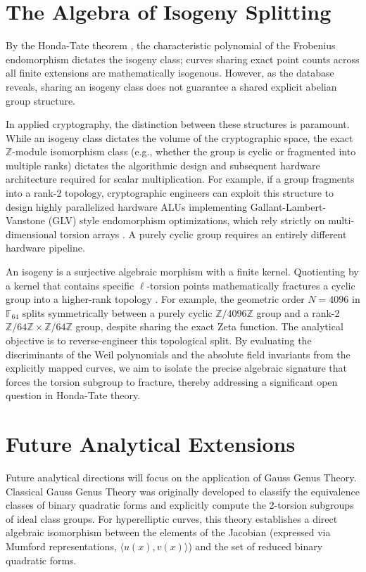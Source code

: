 \documentclass[11pt,letterpaper]{article}
\begin{document}
	\section{The Algebra of Isogeny Splitting}
	By the Honda-Tate theorem \cite{Tate1966}, the characteristic polynomial of the Frobenius endomorphism dictates the isogeny class; curves sharing exact point counts across all finite extensions are mathematically isogenous. However, as the database reveals, sharing an isogeny class does not guarantee a shared explicit abelian group structure.
	
	In applied cryptography, the distinction between these structures is paramount. While an isogeny class dictates the volume of the cryptographic space, the exact $\mathbb{Z}$-module isomorphism class (e.g., whether the group is cyclic or fragmented into multiple ranks) dictates the algorithmic design and subsequent hardware architecture required for scalar multiplication. For example, if a group fragments into a rank-2 topology, cryptographic engineers can exploit this structure to design highly parallelized hardware ALUs implementing Gallant-Lambert-Vanstone (GLV) style endomorphism optimizations, which rely strictly on multi-dimensional torsion arrays \cite{Gallant2001, Wollinger2005}. A purely cyclic group requires an entirely different hardware pipeline.
	
	An isogeny is a surjective algebraic morphism with a finite kernel. Quotienting by a kernel that contains specific $\ell$-torsion points mathematically fractures a cyclic group into a higher-rank topology \cite{Mazur1977}. For example, the geometric order $N=4096$ in $\mathbb{F}_{64}$ splits symmetrically between a purely cyclic $\mathbb{Z}/4096\mathbb{Z}$ group and a rank-2 $\mathbb{Z}/64\mathbb{Z} \times \mathbb{Z}/64\mathbb{Z}$ group, despite sharing the exact Zeta function. The analytical objective is to reverse-engineer this topological split. By evaluating the discriminants of the Weil polynomials and the absolute field invariants from the explicitly mapped curves, we aim to isolate the precise algebraic signature that forces the torsion subgroup to fracture, thereby addressing a significant open question in Honda-Tate theory.
	
	\section{Future Analytical Extensions}
	Future analytical directions will focus on the application of Gauss Genus Theory. Classical Gauss Genus Theory was originally developed to classify the equivalence classes of binary quadratic forms and explicitly compute the 2-torsion subgroups of ideal class groups. For hyperelliptic curves, this theory establishes a direct algebraic isomorphism between the elements of the Jacobian (expressed via Mumford representations, $\langle u(x), v(x) \rangle$) and the set of reduced binary quadratic forms. 
	
\end{document}
